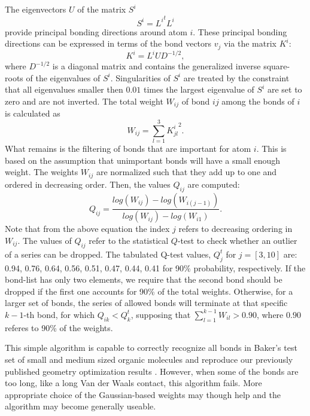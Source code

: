\documentclass[prl,aps,preprint,superbib,12pt]{revtex4}
\begin{document}
The eigenvectors $U$ of the matrix $S^{i}$
\begin{equation}
S^{i} = {L^{i}}^{t} L^{i}
\end{equation}
provide principal bonding directions around atom $i$.
These principal bonding directions can be expressed in terms of
the bond vectors $v_{j}$ via the matrix $K^{i}$:
\begin{equation}
K^{i} = L^{i} U D^{-1/2} ,
\end{equation}
where $D^{-1/2}$ is a diagonal matrix and contains the generalized
inverse square-roots of the eigenvalues of $S^{i}$. Singularities
of $S^{i}$ are treated by the constraint that all eigenvalues
smaller then $0.01$ times the largest eigenvalue 
of $S^{i}$ are set to zero and are not inverted.
The total weight $W_{ij}$ of bond $ij$ among the bonds of $i$
is calculated as 
\begin{equation}
W_{ij} = \sum_{l=1}^{3} {K^{i}_{jl}}^{2} .  
\end{equation}
What remains is the filtering of bonds that are important for 
atom $i$. This is based on the assumption that unimportant
bonds will have a small enough weight. The weights $W_{ij}$ are
normalized such that they add up to one and
ordered in decreasing order. Then, the values $Q_{ij}$ are computed:
\begin{equation}
Q_{ij} = \frac{log(W_{ij})-log(W_{i(j-1)})}{log(W_{ij})-log(W_{i1})}.
\end{equation}
Note that from the above equation the index $j$ refers to decreasing
ordering in $W_{ij}$.
The values of $Q_{ij}$ refer to the statistical $Q$-test to check
whether an outlier of a series can be dropped. The tabulated Q-test
values, $Q^{t}_{j}$ for $j=[3,10]$ are: 0.94,  0.76,  0.64,  
0.56,  0.51,  0.47, 0.44, 0.41 for 90\% probability, respectively. 
If the bond-list
has only two elements, we require that the second bond should be
dropped if the first one accounts for 90\% of the total weights.
Otherwise, for a larger set of bonds, the series of allowed bonds will
terminate at that specific $k-1$-th bond, for which $Q_{ik}<Q^{t}_{k}$,
supposing that $\sum_{l=1}^{k-1} W_{il} > 0.90 $, where $0.90$
referes to 90\% of the weights. 

This simple algorithm is capable to correctly 
recognize all bonds in Baker's
test set of small and medium sized organic molecules and
reproduce our previously published geometry optimization results 
\cite{KNemeth04}. However, when some of the bonds are too long, like 
a long Van der Waals contact, this algorithm fails. More
appropriate choice of the Gaussian-based weights may though help and
the algorithm may become generally useable.
\end{document}
